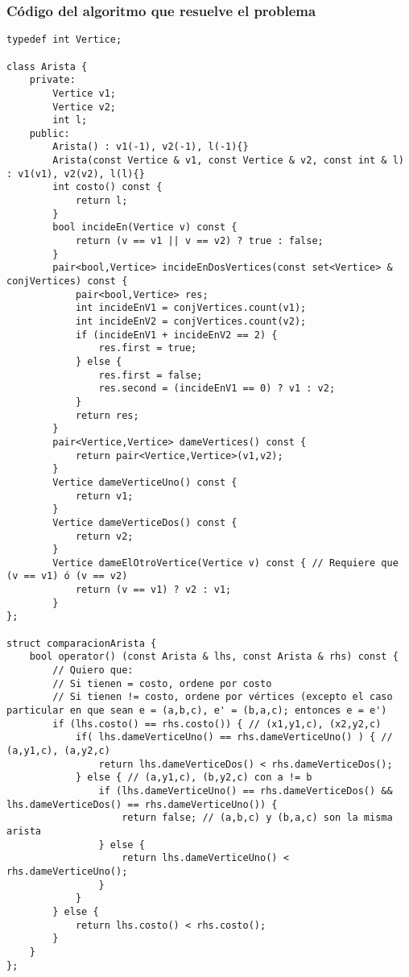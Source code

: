 \subsubsection{Código del algoritmo que resuelve el problema}
\begin{lstlisting}[frame=single]
typedef int Vertice;

class Arista {
    private:
        Vertice v1;
        Vertice v2;
        int l;
    public:
        Arista() : v1(-1), v2(-1), l(-1){}
        Arista(const Vertice & v1, const Vertice & v2, const int & l) : v1(v1), v2(v2), l(l){}
        int costo() const {
            return l;
        }
        bool incideEn(Vertice v) const {
            return (v == v1 || v == v2) ? true : false;
        }
        pair<bool,Vertice> incideEnDosVertices(const set<Vertice> & conjVertices) const {
            pair<bool,Vertice> res;
            int incideEnV1 = conjVertices.count(v1);
            int incideEnV2 = conjVertices.count(v2);
            if (incideEnV1 + incideEnV2 == 2) {
                res.first = true;
            } else {
                res.first = false;
                res.second = (incideEnV1 == 0) ? v1 : v2;
            }
            return res;
        }
        pair<Vertice,Vertice> dameVertices() const {
            return pair<Vertice,Vertice>(v1,v2);
        }
        Vertice dameVerticeUno() const {
            return v1;
        }
        Vertice dameVerticeDos() const {
            return v2;
        }
        Vertice dameElOtroVertice(Vertice v) const { // Requiere que (v == v1) ó (v == v2)
            return (v == v1) ? v2 : v1;
        }
};

struct comparacionArista {
    bool operator() (const Arista & lhs, const Arista & rhs) const {
        // Quiero que:
        // Si tienen = costo, ordene por costo
        // Si tienen != costo, ordene por vértices (excepto el caso particular en que sean e = (a,b,c), e' = (b,a,c); entonces e = e')
        if (lhs.costo() == rhs.costo()) { // (x1,y1,c), (x2,y2,c)
            if( lhs.dameVerticeUno() == rhs.dameVerticeUno() ) { // (a,y1,c), (a,y2,c)
                return lhs.dameVerticeDos() < rhs.dameVerticeDos();
            } else { // (a,y1,c), (b,y2,c) con a != b
                if (lhs.dameVerticeUno() == rhs.dameVerticeDos() && lhs.dameVerticeDos() == rhs.dameVerticeUno()) {
                    return false; // (a,b,c) y (b,a,c) son la misma arista
                } else {
                    return lhs.dameVerticeUno() < rhs.dameVerticeUno();
                }
            }
        } else {
            return lhs.costo() < rhs.costo();
        }
    }
};


\end{lstlisting}

